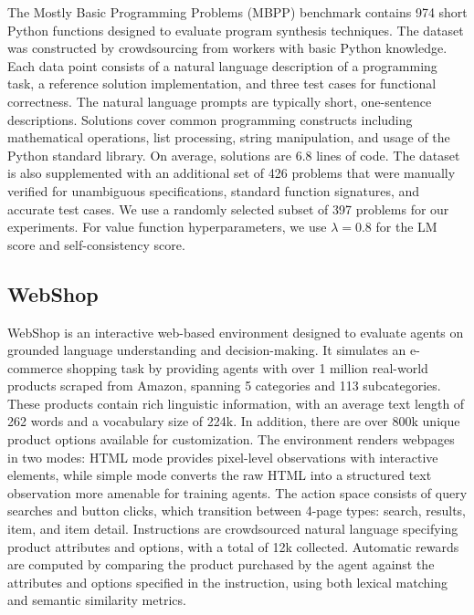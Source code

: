 {The Mostly Basic Programming Problems (MBPP) \cite{austin2021program} benchmark contains 974 short Python functions designed to evaluate program synthesis techniques. The dataset was constructed by crowdsourcing from workers with basic Python knowledge. Each data point consists of a natural language description of a programming task, a reference solution implementation, and three test cases for functional correctness. The natural language prompts are typically short, one-sentence descriptions. Solutions cover common programming constructs including mathematical operations, list processing, string manipulation, and usage of the Python standard library. On average, solutions are 6.8 lines of code. The dataset is also supplemented with an additional set of 426 problems that were manually verified for unambiguous specifications, standard function signatures, and accurate test cases. We use a randomly selected subset of 397 problems for our experiments. For value function hyperparameters, we use $\lambda = 0.8$ for the LM score and self-consistency score.

\subsection{WebShop}

WebShop \citep{yao2022webshop} is an interactive web-based environment designed to evaluate agents on grounded language understanding and decision-making. It simulates an e-commerce shopping task by providing agents with over 1 million real-world products scraped from Amazon, spanning 5 categories and 113 subcategories. These products contain rich linguistic information, with an average text length of 262 words and a vocabulary size of 224k. In addition, there are over 800k unique product options available for customization. The environment renders webpages in two modes: HTML mode provides pixel-level observations with interactive elements, while simple mode converts the raw HTML into a structured text observation more amenable for training agents. The action space consists of query searches and button clicks, which transition between 4-page types: search, results, item, and item detail. Instructions are crowdsourced natural language specifying product attributes and options, with a total of 12k collected. Automatic rewards are computed by comparing the product purchased by the agent against the attributes and options specified in the instruction, using both lexical matching and semantic similarity metrics. 
\\

}
